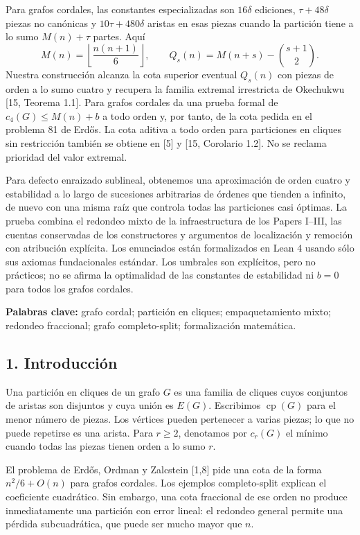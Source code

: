 \documentclass[spanish,11pt,a4paper]{article}
\begin{document}
Para grafos cordales, las constantes especializadas son \(16\delta\) ediciones, \(\tau+48\delta\) piezas no canónicas y \(10\tau+480\delta\) aristas en esas piezas cuando la partición tiene a lo sumo \(M(n)+\tau\) partes. Aquí \[
M(n)=\left\lfloor\frac{n(n+1)}6\right\rfloor,\qquad
Q_s(n)=M(n+s)-\binom{s+1}{2}.
\] Nuestra construcción alcanza la cota superior eventual \(Q_s(n)\) con piezas de orden a lo sumo cuatro y recupera la familia extremal irrestricta de Okechukwu {[}15, Teorema 1.1{]}. Para grafos cordales da una prueba formal de \(c_4(G)\le M(n)+b\) a todo orden y, por tanto, de la cota pedida en el problema 81 de Erdős. La cota aditiva a todo orden para particiones en cliques sin restricción también se obtiene en {[}5{]} y {[}15, Corolario 1.2{]}. No se reclama prioridad del valor extremal.

Para defecto enraizado sublineal, obtenemos una aproximación de orden cuatro y estabilidad a lo largo de sucesiones arbitrarias de órdenes que tienden a infinito, de nuevo con una misma raíz que controla todas las particiones casi óptimas. La prueba combina el redondeo mixto de la infraestructura de los Papers I--III, las cuentas conservadas de los constructores y argumentos de localización y remoción con atribución explícita. Los enunciados están formalizados en Lean 4 usando sólo sus axiomas fundacionales estándar. Los umbrales son explícitos, pero no prácticos; no se afirma la optimalidad de las constantes de estabilidad ni \(b=0\) para todos los grafos cordales.

\textbf{Palabras clave:} grafo cordal; partición en cliques; empaquetamiento mixto; redondeo fraccional; grafo completo-split; formalización matemática.

\subsection{1. Introducción}\label{introduccion}

Una partición en cliques de un grafo \(G\) es una familia de cliques cuyos conjuntos de aristas son disjuntos y cuya unión es \(E(G)\). Escribimos \(\operatorname{cp}(G)\) para el menor número de piezas. Los vértices pueden pertenecer a varias piezas; lo que no puede repetirse es una arista. Para \(r\ge2\), denotamos por \(c_r(G)\) el mínimo cuando todas las piezas tienen orden a lo sumo \(r\).

El problema de Erdős, Ordman y Zalcstein {[}1,8{]} pide una cota de la forma \(n^2/6+O(n)\) para grafos cordales. Los ejemplos completo-split explican el coeficiente cuadrático. Sin embargo, una cota fraccional de ese orden no produce inmediatamente una partición con error lineal: el redondeo general permite una pérdida subcuadrática, que puede ser mucho mayor que \(n\).
\end{document}
